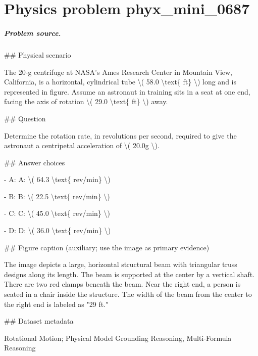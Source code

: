 
\chapter{Physics problem phyx\_mini\_0687}
\label{ch:PhyXMiniProblems_problem_phyx_mini_0687}

\paragraph{Problem source.}
\#\# Physical scenario

The 20-g centrifuge at NASA's Ames Research Center in Mountain View, California, is a horizontal, cylindrical tube \textbackslash{}( 58.0 \textbackslash{}text\{ ft\} \textbackslash{}) long and is represented in figure. Assume an astronaut in training sits in a seat at one end, facing the axis of rotation \textbackslash{}( 29.0 \textbackslash{}text\{ ft\} \textbackslash{}) away.

\#\# Question

Determine the rotation rate, in revolutions per second, required to give the astronaut a centripetal acceleration of \textbackslash{}( 20.0g \textbackslash{}).

\#\# Answer choices

- A: A: \textbackslash{}( 64.3 \textbackslash{}text\{ rev/min\} \textbackslash{})

- B: B: \textbackslash{}( 22.5 \textbackslash{}text\{ rev/min\} \textbackslash{})

- C: C: \textbackslash{}( 45.0 \textbackslash{}text\{ rev/min\} \textbackslash{})

- D: D: \textbackslash{}( 36.0 \textbackslash{}text\{ rev/min\} \textbackslash{})

\#\# Figure caption (auxiliary; use the image as primary evidence)

The image depicts a large, horizontal structural beam with triangular truss designs along its length. The beam is supported at the center by a vertical shaft. There are two red clamps beneath the beam. Near the right end, a person is seated in a chair inside the structure. The width of the beam from the center to the right end is labeled as "29 ft."

\#\# Dataset metadata

Rotational Motion; Physical Model Grounding Reasoning, Multi-Formula Reasoning

